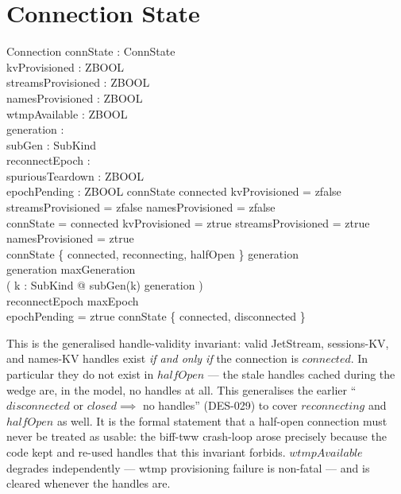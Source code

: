 \documentclass[a4paper,10pt,fleqn]{article}
\begin{document}
\section{Connection State}

\begin{schema}{Connection}
  connState : ConnState \\
  kvProvisioned : ZBOOL \\
  streamsProvisioned : ZBOOL \\
  namesProvisioned : ZBOOL \\
  wtmpAvailable : ZBOOL \\
  generation : \nat \\
  subGen : SubKind \fun \nat \\
  reconnectEpoch : \nat \\
  spuriousTeardown : ZBOOL \\
  epochPending : ZBOOL
  \where
  connState \neq connected \implies
  kvProvisioned = zfalse \land
  streamsProvisioned = zfalse \land
  namesProvisioned = zfalse \\
  connState = connected \implies
  kvProvisioned = ztrue \land
  streamsProvisioned = ztrue \land
  namesProvisioned = ztrue \\
  connState \in \{ connected, reconnecting, halfOpen \} \implies
  generation  \\
  generation \leq maxGeneration \\
  ( \forall k : SubKind @ subGen(k) \leq generation ) \\
  reconnectEpoch \leq maxEpoch \\
  epochPending = ztrue \implies
  connState \in \{ connected, disconnected \}
\end{schema}

This is the generalised handle-validity invariant: valid
JetStream, sessions-KV, and names-KV handles exist \emph{if and
only if} the connection is $connected$.  In particular they do
not exist in $halfOpen$ --- the stale handles cached during the
wedge are, in the model, no handles at all.  This generalises the
earlier ``$disconnected$ or $closed \implies$ no handles'' (DES-029)
to cover $reconnecting$ and $halfOpen$ as well.  It is the
formal statement that a half-open connection must never be treated
as usable: the biff-tww crash-loop arose precisely because the code
kept and re-used handles that this invariant forbids.
$wtmpAvailable$ degrades independently --- wtmp provisioning
failure is non-fatal --- and is cleared whenever the handles are.
\end{document}
